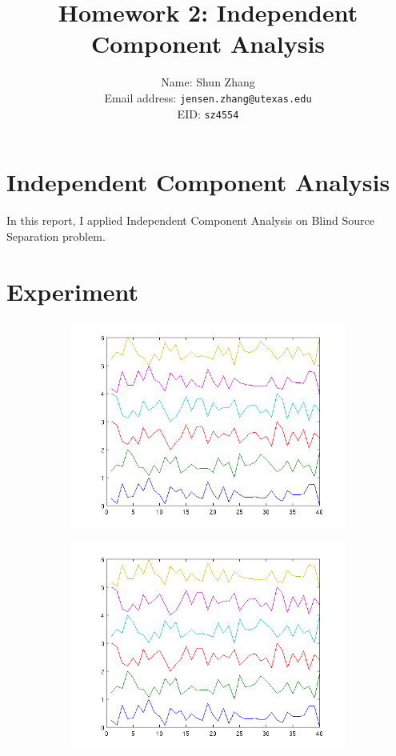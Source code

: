 \documentclass[10pt]{article}
\title{Homework 2: Independent Component Analysis}
\author{Name: Shun Zhang\\
Email address: \texttt{jensen.zhang@utexas.edu}\\
EID: \texttt{sz4554}}
\date{}
\begin{document}
\maketitle

\section{Independent Component Analysis}

In this report, I applied Independent Component Analysis on Blind Source
Separation problem.

\section{Experiment}

\begin{figure}
\centering
\begin{subfigure}[b]{0.3\textwidth}
	\includegraphics[width=\textwidth]{rep2.png}
\end{subfigure}

\begin{subfigure}[b]{0.3\textwidth}
	\includegraphics[width=\textwidth]{rep3.png}
\end{subfigure}


\end{figure}
\end{document}
